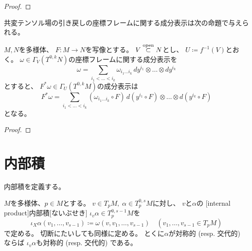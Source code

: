 \documentclass[report]{jlreq}
\begin{document}
\begin{proof}
    \TODO{}
\end{proof}

共変テンソル場の引き戻しの座標フレームに関する成分表示は次の命題で与えられる。

\begin{proposition}[引き戻しの座標フレームに関する成分表示]
    $M, N$を多様体、
    $F \colon M \to N$を{\smooth}写像とする。
    $V \stackrel{\text{open}}{\subset} N$とし、
    $U \coloneqq f^{-1}(V)$とおく。
    $\omega \in \Gamma_V(T^{0, k}N)$の座標フレームに関する成分表示を
    \begin{equation}
        \omega
            = \sum_{i_1 < \dots < i_k}
            \omega_{i_1 \dots i_k} \,
            dy^{i_1} \otimes \dots \otimes dy^{i_k}
    \end{equation}
    とすると、
    $F^* \omega \in \Gamma_U(T^{0, k}M)$の成分表示は
    \begin{equation}
        F^* \omega
            = \sum_{i_1 < \dots < i_k}
            (\omega_{i_1 \dots i_k} \circ F) \,
            d(y^{i_1} \circ F) \otimes \dots \otimes d(y^{i_k} \circ F)
    \end{equation}
    となる。
\end{proposition}

\begin{proof}
    \TODO{}
\end{proof}

%
\section{内部積}

内部積を定義する。

\begin{definition}[内部積]
    $M$を多様体、$p \in M$とする。
    $v \in T_pM, \; \alpha \in T_p^{0, s}M$に対し、
    $v$と$\alpha$の
    [internal product]{内部積}[ないぶせき]
    $\iota_v \alpha \in T_p^{0, s - 1}M$を
    \begin{equation}
        \iota_X \alpha (v_1, \dots, v_{s - 1})
            \coloneqq \omega (v, v_1, \dots, v_{s - 1})
            \quad (v_1, \dots, v_{s - 1} \in T_pM)
    \end{equation}
    で定める。
    切断にたいしても同様に定める。
    とくに$\alpha$が対称的 (resp. 交代的) ならば
    $\iota_v \alpha$も対称的 (resp. 交代的) である。
\end{definition}
\end{document}
